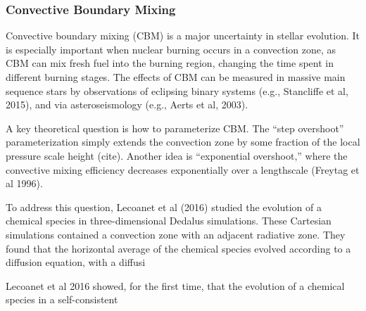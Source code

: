 {\color{purple}
\subsubsection{Convective Boundary Mixing}
}

Convective boundary mixing (CBM) is a major uncertainty in stellar evolution. It is especially important when nuclear burning occurs in a convection zone, as CBM can mix fresh fuel into the burning region, changing the time spent in different burning stages. The effects of CBM can be measured in massive main sequence stars by observations of eclipsing binary systems (e.g., Stancliffe et al, 2015), and via asteroseismology (e.g., Aerts et al, 2003).

A key theoretical question is how to parameterize CBM. The ``step overshoot'' parameterization simply extends the convection zone by some fraction of the local pressure scale height (cite). Another idea is ``exponential overshoot,'' where the convective mixing efficiency decreases exponentially over a lengthscale (Freytag et al 1996).

To address this question, Lecoanet et al (2016) studied the evolution of a chemical species in three-dimensional Dedalus simulations.  These Cartesian simulations contained a convection zone with an adjacent radiative zone. They found that the horizontal average of the chemical species evolved according to a diffusion equation, with a diffusi

Lecoanet et al 2016 showed, for the first time, that the evolution of a chemical species in a self-consistent 

